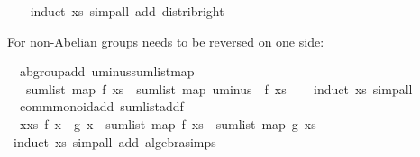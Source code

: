 \begin{isabellebody}
%
\isadelimproof
\ \ %
\endisadelimproof
%
\isatagproof
{}\isamarkupfalse%
\ {\isacharparenleft}{\kern0pt}induct\ xs{\isacharparenright}{\kern0pt}\ {\isacharparenleft}{\kern0pt}simp{\isacharunderscore}{\kern0pt}all\ add{\isacharcolon}{\kern0pt}\ distrib{\isacharunderscore}{\kern0pt}right{\isacharparenright}{\kern0pt}%
\endisatagproof
{\isafoldproof}%
%
\isadelimproof
%
\endisadelimproof
%
\begin{isamarkuptext}%
For non-Abelian groups  needs to be reversed on one side:%
\end{isamarkuptext}\isamarkuptrue%
\isamarkupfalse%
\ {\isacharparenleft}{\kern0pt}\ ab{\isacharunderscore}{\kern0pt}group{\isacharunderscore}{\kern0pt}add{\isacharparenright}{\kern0pt}\ uminus{\isacharunderscore}{\kern0pt}sum{\isacharunderscore}{\kern0pt}list{\isacharunderscore}{\kern0pt}map{\isacharcolon}{\kern0pt}\isanewline
\ \ {\isachardoublequoteopen}{\isacharminus}{\kern0pt}\ sum{\isacharunderscore}{\kern0pt}list\ {\isacharparenleft}{\kern0pt}map\ f\ xs{\isacharparenright}{\kern0pt}\ {\isacharequal}{\kern0pt}\ sum{\isacharunderscore}{\kern0pt}list\ {\isacharparenleft}{\kern0pt}map\ {\isacharparenleft}{\kern0pt}uminus\ {\isasymcirc}\ f{\isacharparenright}{\kern0pt}\ xs{\isacharparenright}{\kern0pt}{\isachardoublequoteclose}\isanewline
%
\isadelimproof
\ \ %
\endisadelimproof
%
\isatagproof
{}\isamarkupfalse%
\ {\isacharparenleft}{\kern0pt}induct\ xs{\isacharparenright}{\kern0pt}\ simp{\isacharunderscore}{\kern0pt}all%
\endisatagproof
{\isafoldproof}%
%
\isadelimproof
\isanewline
%
\endisadelimproof
\isanewline
{}\isamarkupfalse%
\ {\isacharparenleft}{\kern0pt}\ comm{\isacharunderscore}{\kern0pt}monoid{\isacharunderscore}{\kern0pt}add{\isacharparenright}{\kern0pt}\ sum{\isacharunderscore}{\kern0pt}list{\isacharunderscore}{\kern0pt}addf{\isacharcolon}{\kern0pt}\isanewline
\ \ {\isachardoublequoteopen}{\isacharparenleft}{\kern0pt}{\isasymSum}x{\isasymleftarrow}xs{\isachardot}{\kern0pt}\ f\ x\ {\isacharplus}{\kern0pt}\ g\ x{\isacharparenright}{\kern0pt}\ {\isacharequal}{\kern0pt}\ sum{\isacharunderscore}{\kern0pt}list\ {\isacharparenleft}{\kern0pt}map\ f\ xs{\isacharparenright}{\kern0pt}\ {\isacharplus}{\kern0pt}\ sum{\isacharunderscore}{\kern0pt}list\ {\isacharparenleft}{\kern0pt}map\ g\ xs{\isacharparenright}{\kern0pt}{\isachardoublequoteclose}\isanewline
%
\isadelimproof
\ \ %
\endisadelimproof
%
\isatagproof
{}\isamarkupfalse%
\ {\isacharparenleft}{\kern0pt}induct\ xs{\isacharparenright}{\kern0pt}\ {\isacharparenleft}{\kern0pt}simp{\isacharunderscore}{\kern0pt}all\ add{\isacharcolon}{\kern0pt}\ algebra{\isacharunderscore}{\kern0pt}simps{\isacharparenright}{\kern0pt}%

\end{isabellebody}
